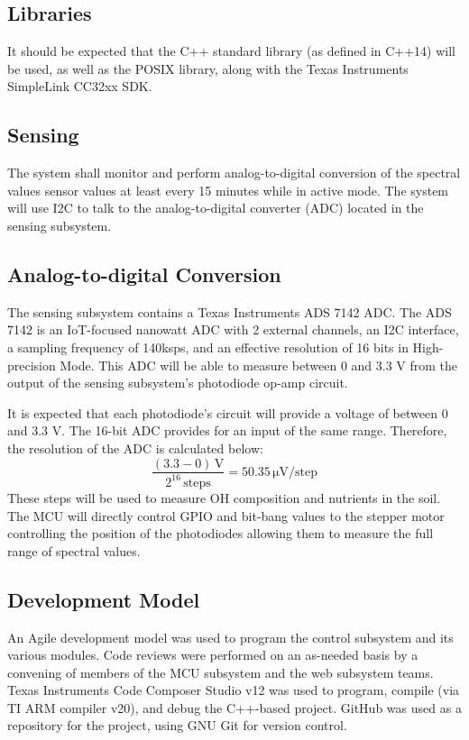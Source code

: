 \subsection{Libraries}
It should be expected that the C++ standard library (as defined in C++14) will be used, as well as the POSIX library, along with the Texas Instruments SimpleLink CC32xx SDK.

\subsection{Sensing} The system shall monitor and perform analog-to-digital conversion of the spectral values sensor values at least every 15 minutes while in active mode. The system will use I2C to talk to the analog-to-digital converter (ADC) located in the sensing subsystem. 

\subsection{Analog-to-digital Conversion}
The sensing subsystem contains a Texas Instruments ADS 7142 ADC. The ADS 7142 is an IoT-focused nanowatt ADC with 2 external channels, an I2C interface, a sampling frequency of 140ksps, and an effective resolution of 16 bits in High-precision Mode. This ADC will be able to measure between 0 and 3.3 V from the output of the sensing subsystem's  photodiode op-amp circuit.

It is expected that each photodiode's circuit will provide a voltage of between 0 and 3.3 V. The 16-bit ADC provides for an input of the same range. Therefore, the resolution of the ADC is calculated below:
\begin{equation}
    \frac{(3.3 - 0)\,\mathrm{V}}{2^{16}\,\mathrm{steps}} =
    50.35\,\mathrm{\mu V}/\mathrm{step}
\end{equation}
These steps will be used to measure OH composition and nutrients in the soil. The MCU will directly control GPIO and bit-bang values to the stepper motor controlling the position of the photodiodes allowing them to measure the full range of spectral values.

\subsection{Development Model}
An Agile development model was used to program the control subsystem and its various modules. Code reviews were performed on an as-needed basis by a convening of members of the MCU subsystem and the web subsystem teams. Texas Instruments Code Composer Studio v12 was used to program, compile (via TI ARM compiler v20), and debug the C++-based project. GitHub was used as a repository for the project, using GNU Git for version control.

